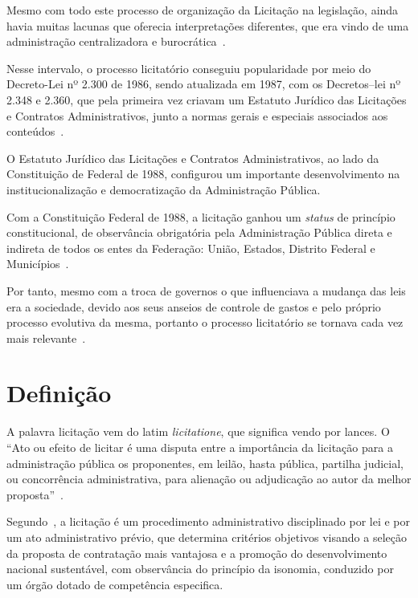 Mesmo com todo este processo de organização da Licitação na legislação, ainda havia muitas lacunas que oferecia interpretações diferentes, que era vindo de uma administração centralizadora e burocrática~\cite{filho2013}. 

Nesse intervalo, o processo licitatório conseguiu popularidade por meio do Decreto-Lei nº 2.300 de 1986, sendo atualizada em 1987, com os Decretos–lei nº 2.348 e 2.360, que pela primeira vez criavam um Estatuto Jurídico das Licitações e Contratos Administrativos, junto a normas gerais e especiais associados aos conteúdos~\cite{oliveira2013}.

O Estatuto Jurídico das Licitações e Contratos Administrativos, ao lado da Constituição de Federal de 1988, configurou um importante desenvolvimento na institucionalização e democratização da Administração Pública.

Com a Constituição Federal de 1988, a licitação ganhou um \textit{status} de princípio constitucional, de observância obrigatória pela Administração Pública direta e indireta de todos os entes da Federação: União, Estados, Distrito Federal e Municípios~\cite{de2011pregao}.

Por tanto, mesmo com a troca de governos o que influenciava a mudança das leis era a sociedade, devido aos seus anseios de controle de gastos e pelo próprio processo evolutiva da mesma, portanto o processo licitatório se tornava cada vez mais relevante~\cite{brazao2013}.

\section{Definição}

A palavra licitação vem do latim \textit{licitatione}, que significa vendo por lances. 
O ``Ato ou efeito de licitar é uma disputa entre a importância da licitação para a administração pública os proponentes, em leilão, hasta pública, partilha judicial, ou concorrência administrativa, para alienação ou adjudicação ao autor da melhor proposta''~\cite{dicionario}.

Segundo~\cite[p. 495]{justen2010curso}, a licitação é um procedimento administrativo disciplinado por lei e por um ato administrativo prévio, que determina critérios objetivos visando a seleção da proposta de contratação mais vantajosa e a promoção do desenvolvimento nacional sustentável, com observância do princípio da isonomia, conduzido por um órgão dotado de competência especifica.

